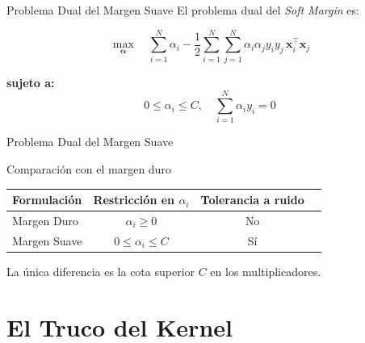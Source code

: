 \documentclass[aspectratio=169,xcolor=dvipsnames]{beamer}
\begin{document}
\begin{frame}{Problema Dual del Margen Suave}
    El problema dual del \textit{Soft Margin} es:

    \begin{equation}
        \max_{\boldsymbol{\alpha}} \quad \sum_{i=1}^{N} \alpha_i - \frac{1}{2} \sum_{i=1}^{N} \sum_{j=1}^{N} \alpha_i \alpha_j y_i y_j \, \mathbf{x}_i^\top \mathbf{x}_j
    \end{equation}

    \textbf{sujeto a:}
    \begin{equation}
        0 \leq \alpha_i \leq C, \quad \sum_{i=1}^{N} \alpha_i y_i = 0
    \end{equation}
\end{frame}
\begin{frame}{Problema Dual del Margen Suave}

    \begin{block}{Comparación con el margen duro}
        \begin{center}
        \begin{tabular}{lccc}
            \toprule
            Formulación & Restricción en $\alpha_i$ & Tolerancia a ruido \\
            \midrule
            Margen Duro & $\alpha_i \geq 0$ & No \\
            Margen Suave & $0 \leq \alpha_i \leq C$ & Sí \\
            \bottomrule
        \end{tabular}
        \end{center}
        La única diferencia es la cota superior $C$ en los multiplicadores.
    \end{block}
\end{frame}

\section{El Truco del Kernel}
\end{document}

